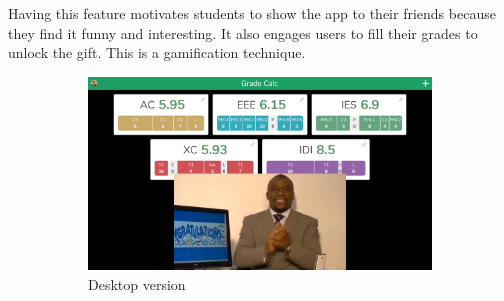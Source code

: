 Having this feature motivates students to show the app to their friends because they find it funny and interesting. It also engages users to fill their grades to unlock the gift. This is a gamification technique.

\vfill
\begin{figure}[ht!]
    \begin{subfigure}[b]{0.757\textwidth-0.1cm}
        \centering
        \includegraphics[width=\textwidth]{media/screenshots/screenshot-easter-egg-pc.png}
        \caption{Desktop version}
    \end{subfigure}
    \hfill
    \begin{subfigure}[b]{0.243\textwidth-0.1cm}
        \centering

\end{subfigure}
\end{figure}
